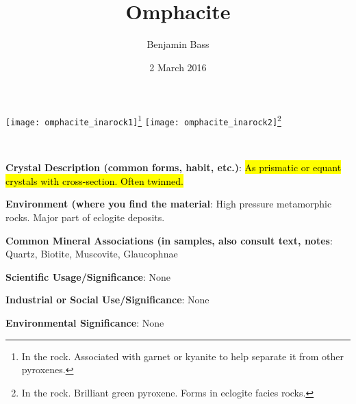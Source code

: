\documentclass[10pt]{article}
\author{Benjamin Bass}
\date{2 March 2016}
\title{\vspace{-2.0cm}Omphacite} %
\begin{document}
\maketitle


\begin{center}
  \texttt{[image: omphacite\_inarock1]}\footnote{In the rock. Associated with garnet or kyanite to help separate it from other pyroxenes.}
  \texttt{[image: omphacite\_inarock2]}\footnote{In the rock. Brilliant green pyroxene. Forms in eclogite facies rocks.}
\end{center}



 \
\
\
\
\
\
\
\
\
\

\begin{framed}
  \textbf{Crystal Description (common forms, habit, etc.)}: \hl{As prismatic or equant crystals with cross-section. Often twinned.}
\end{framed}

\begin{framed}
  \textbf{Environment (where you find the material}: High pressure metamorphic rocks. Major part of eclogite deposits.
\end{framed}

\begin{framed}
  \textbf{Common Mineral Associations (in samples, also consult text, notes}: Quartz, Biotite, Muscovite, Glaucophnae
\end{framed}

\begin{framed}
  \textbf{Scientific Usage/Significance}: None
\end{framed}

\begin{framed}
  \textbf{Industrial or Social Use/Significance}: None
\end{framed}

\begin{framed}
  \textbf{Environmental Significance}: None
\end{framed}

\end{document}
